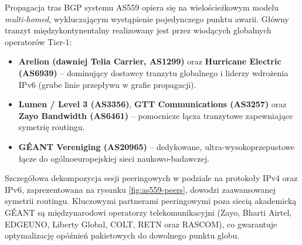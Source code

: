 

Propagacja tras BGP systemu AS559 opiera się na wielościeżkowym modelu \textit{multi-homed}, wykluczającym wystąpienie pojedynczego punktu awarii. Główny tranzyt międzykontynentalny realizowany jest przez wiodących globalnych operatorów Tier-1:
\begin{itemize}
    \item \textbf{Arelion (dawniej Telia Carrier, AS1299)} oraz \textbf{Hurricane Electric (AS6939)} -- dominujący dostawcy tranzytu globalnego i liderzy wdrożenia IPv6 (grube linie przepływu w grafie propagacji).
    \item \textbf{Lumen / Level 3 (AS3356)}, \textbf{GTT Communications (AS3257)} oraz \textbf{Zayo Bandwidth (AS6461)} -- pomocnicze łącza tranzytowe zapewniające symetrię routingu.
    \item \textbf{GÉANT Vereniging (AS20965)} -- dedykowane, ultra-wysokoprzepustowe łącze do ogólnoeuropejskiej sieci naukowo-badawczej.
\end{itemize}


Szczegółowa dekompozycja sesji peeringowych w podziale na protokoły IPv4 oraz IPv6, zaprezentowana na rysunku \ref{fig:as559-peers}, dowodzi zaawansowanej symetrii routingu. Kluczowymi partnerami peeringowymi poza siecią akademicką GÉANT są międzynarodowi operatorzy telekomunikacyjni (Zayo, Bharti Airtel, EDGEUNO, Liberty Global, COLT, RETN oraz RASCOM), co gwarantuje optymalizację opóźnień pakietowych do dowolnego punktu globu.



